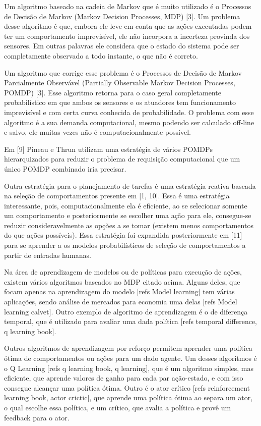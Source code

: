 Um algoritmo baseado na cadeia de Markov que é muito utilizado é o Processos de Decisão de Markov (Markov Decision Processes, MDP) [3]. Um problema desse algoritmo é que, embora ele leve em conta que as ações executadas podem ter um comportamento imprevisível, ele não incorpora a incerteza provinda dos sensores. Em outras palavras ele considera que o estado do sistema pode ser completamente observado a todo instante, o que não é correto.

Um algoritmo que corrige esse problema é o Processos de Decisão de Markov Parcialmente Observável (Partially Observable Markov Decision Processes, POMDP) [3]. Esse algoritmo retorna para o caso geral completamente probabilístico em que ambos os sensores e os atuadores tem funcionamento imprevisível e com certa curva conhecida de probabilidade. O problema com esse algoritmo é a sua demanda computacional, mesmo podendo ser calculado off-line e salvo, ele muitas vezes não é computacionalmente possível.

Em [9] Pineau e Thrun utilizam uma estratégia de vários POMDPs hierarquizados para reduzir o problema de requisição computacional que um único POMDP combinado iria precisar.

Outra estratégia para o planejamento de tarefas é uma estratégia reativa baseada na seleção de comportamentos presente em [1, 10]. Essa é uma estratégia interessante, pois, computacionalmente ela é eficiente, ao se selecionar somente um comportamento e posteriormente se escolher uma ação para ele, consegue-se reduzir consideravelmente as opções a se tomar (existem menos comportamentos do que ações possíveis). Essa estratégia foi expandida posteriormente em [11] para se aprender a os modelos probabilísticos de seleção de comportamentos a partir de entradas humanas.

Na área de aprendizagem de modelos ou de políticas para execução de ações, existem vários algoritmos baseados no MDP citado acima. Alguns deles, que focam apenas na aprendizagem do modelo [refs Model learning] tem várias aplicações, sendo análise de mercados para economia uma delas [refs Model learning calvet]. Outro exemplo de algoritmo de aprendizagem é o de diferença temporal, que é utilizado para avaliar uma dada política [refs temporal difference, q learning book].

Outros algoritmos de aprendizagem por reforço permitem aprender uma política ótima de comportamentos ou ações para um dado agente. Um desses algoritmos é o Q Learning [refs q learning book, q learning], que é um algoritmo simples, mas eficiente, que aprende valores de ganho para cada par ação-estado, e com isso consegue alcançar uma política ótima. Outro é o ator crítico [refs reinforcement learning book, actor crictic], que aprende uma política ótima ao separa um ator, o qual escolhe essa política, e um crítico, que avalia a política e provê um feedback para o ator.

